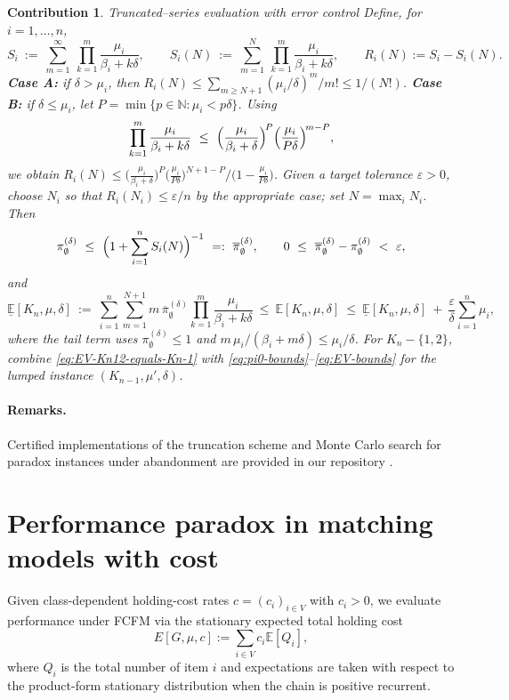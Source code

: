 \documentclass[11pt]{article}
\newtheorem{contribution}{Contribution}
\begin{document}
\begin{contribution}{Truncated–series evaluation with error control}
	Define, for $i=1,\dots,n$,
	\[
	S_i\ :=\ \sum_{m=1}^{\infty}\ \prod_{k=1}^{m}\frac{\mu_i}{\beta_i+k\delta},\qquad
	S_i(N)\ :=\ \sum_{m=1}^{N}\ \prod_{k=1}^{m}\frac{\mu_i}{\beta_i+k\delta},\qquad
	R_i(N):=S_i-S_i(N).
	\]
	\textbf{Case A:} if $\delta>\mu_i$, then $R_i(N)\le \sum_{m\ge N+1}(\mu_i/\delta)^m/m!\le 1/(N!)$.  
	\textbf{Case B:} if $\delta\le \mu_i$, let $P=\min\{p\in\mathbb{N}: \mu_i<p\delta\}$. Using
	\[
	\prod_{k=1}^{m}\frac{\mu_i}{\beta_i+k\delta}\ \le\ 
	\Bigl(\frac{\mu_i}{\beta_i+\delta}\Bigr)^{\!P}
	\Bigl(\frac{\mu_i}{P\delta}\Bigr)^{\!m-P},
	\]
	we obtain $R_i(N)\le \bigl(\frac{\mu_i}{\beta_i+\delta}\bigr)^{P}\bigl(\frac{\mu_i}{P\delta}\bigr)^{N+1-P}\big/\bigl(1-\frac{\mu_i}{P\delta}\bigr)$.  
	Given a target tolerance $\varepsilon>0$, choose $N_i$ so that $R_i(N_i)\le \varepsilon/n$ by the appropriate case; set $N=\max_i N_i$. Then
	\begin{equation}\label{eq:pi0-bounds}
		\pi_{\emptyset}^{(\delta)}\ \le\ \Bigl(1+\sum_{i=1}^{n}S_i(N)\Bigr)^{-1}\ =:\ \overline{\pi}_{\emptyset}^{(\delta)},\qquad
		0\ \le\ \overline{\pi}_{\emptyset}^{(\delta)}-\pi_{\emptyset}^{(\delta)}\ <\ \varepsilon,
	\end{equation}
	and
	\begin{equation}\label{eq:EV-bounds}
		\underline{\mathbb{E}}[K_n,\mu,\delta]\ :=\ \sum_{i=1}^{n}\sum_{m=1}^{N+1}m\,\overline{\pi}_{\emptyset}^{(\delta)}\prod_{k=1}^{m}\frac{\mu_i}{\beta_i+k\delta}
		\ \le\ \mathbb{E}[K_n,\mu,\delta]\ \le\
		\underline{\mathbb{E}}[K_n,\mu,\delta]\ +\ \frac{\varepsilon}{\delta}\sum_{i=1}^{n}\mu_i,
	\end{equation}
	where the tail term uses $\pi_{\emptyset}^{(\delta)}\le1$ and $m\,\mu_i/(\beta_i+m\delta)\le \mu_i/\delta$.  
	For $K_n-\{1,2\}$, combine \eqref{eq:EV-Kn12-equals-Kn-1} with \eqref{eq:pi0-bounds}–\eqref{eq:EV-bounds} for the lumped instance $(K_{n-1},\mu',\delta)$. 
\end{contribution}

\paragraph{Remarks.}
Certified implementations of the truncation scheme and Monte Carlo search for paradox instances under abandonment are provided in our repository \cite{li2025a}.


\section{Performance paradox in matching models with cost}\label{sec:cost}
Given class-dependent holding-cost rates $c=(c_i)_{i\in V}$ with $c_i>0$, we evaluate performance under \textsc{FCFM} via the stationary expected total holding cost
\begin{equation}\label{eq:def-cost}
	E[G,\mu,c]:=\sum_{i\in V} c_i\mathbb{E}[Q_i],
\end{equation}
where $Q_i$ is the total number of item $i$ and expectations are taken with respect to the product-form stationary distribution when the chain is positive recurrent.
\end{document}
